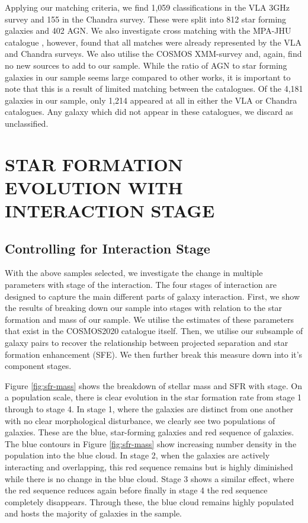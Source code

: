 \documentclass[fleqn,usenatbib]{mnras}
\begin{document}
Applying our matching criteria, we find 1,059 classifications in the VLA 3GHz survey and 155 in the Chandra survey. These were split into 812 star forming galaxies and 402 AGN. We also investigate cross matching with the MPA-JHU catalogue \citep{2003MNRAS.341...33K, 2004MNRAS.351.1151B, 2007ApJS..173..267S}, however, found that all matches were already represented by the VLA and Chandra surveys. We also utilise the COSMOS XMM-survey and, again, find no new sources to add to our sample. While the ratio of AGN to star forming galaxies in our sample seems large compared to other works, it is important to note that this is a result of limited matching between the catalogues. Of the 4,181 galaxies in our sample, only 1,214 appeared at all in either the VLA or Chandra catalogues. Any galaxy which did not appear in these catalogues, we discard as unclassified. 

\section{STAR FORMATION EVOLUTION WITH INTERACTION STAGE}\label{results:SF_stage}
\subsection{Controlling for Interaction Stage}
\noindent With the above samples selected, we investigate the change in multiple parameters with stage of the interaction. The four stages of interaction are designed to capture the main different parts of galaxy interaction. First, we show the results of breaking down our sample into stages with relation to the star formation and mass of our sample. We utilise the estimates of these parameters that exist in the COSMOS2020 catalogue itself. Then, we utilise our subsample of galaxy pairs to recover the relationship between projected separation and star formation enhancement (SFE). We then further break this measure down into it's component stages.

Figure \ref{fig:sfr-mass} shows the breakdown of stellar mass and SFR with stage. On a population scale, there is clear evolution in the star formation rate from stage 1 through to stage 4. In stage 1, where the galaxies are distinct from one another with no clear morphological disturbance, we clearly see two populations of galaxies. These are the blue, star-forming galaxies and red sequence of galaxies. The blue contours in Figure \ref{fig:sfr-mass} show increasing number density in the population into the blue cloud. In stage 2, when the galaxies are actively interacting and overlapping, this red sequence remains but is highly diminished while there is no change in the blue cloud. Stage 3 shows a similar effect, where the red sequence reduces again before finally in stage 4 the red sequence completely disappears. Through these, the blue cloud remains highly populated and hosts the majority of galaxies in the sample.
\end{document}
